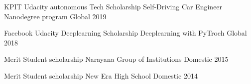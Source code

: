 


\begin{cvhonors}

  \cvhonor
    {KPIT Udacity autonomous Tech Scholarship } %
    {Self-Driving Car Engineer Nanodegree program} %
    {Global} %
    {2019} %

  \cvhonor
    {Facebook Udacity Deeplearning Scholarship} %
    {Deeplearning with PyTroch} %
    {Global} %
    {2018} %

  \cvhonor
    {Merit Student scholarship} %
    {Narayana Group of Institutions} %
    {Domestic} %
    {2015} %

  \cvhonor
    {Merit Student scholarship} %
    {New Era High School} %
    {Domestic} %
    {2014} %

\end{cvhonors}







